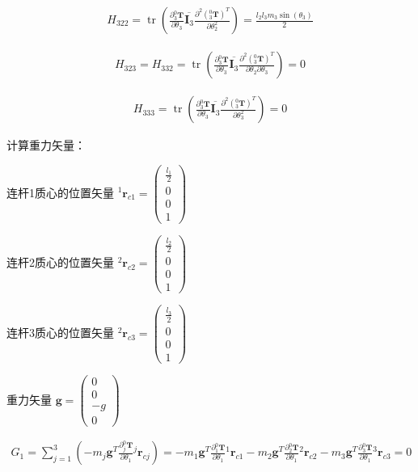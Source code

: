 \documentclass{homework}
\begin{document}
\begin{sol}
\begin{align*}
  H_{322} = \operatorname{tr} (\frac{\partial {^0_3}\mathbf{T}}{\partial \theta_3} \overline{\mathbf{I}_3} \frac{\partial^2 ({^0_3}\mathbf{T})^T}{\partial \theta_2^2})
          = \frac{l_2 l_3 m_3 \sin(\theta_3)}{2}
\end{align*}

\begin{align*}
  H_{323} = H_{332} = \operatorname{tr} (\frac{\partial {^0_3}\mathbf{T}}{\partial \theta_3} \overline{\mathbf{I}_3} \frac{\partial^2 ({^0_3}\mathbf{T})^T}{\partial \theta_2 \partial \theta_3}) 
                    = 0
\end{align*}

\begin{align*}
  H_{333} = \operatorname{tr} (\frac{\partial {^0_3}\mathbf{T}}{\partial \theta_3} \overline{\mathbf{I}_3} \frac{\partial^2 ({^0_3}\mathbf{T})^T}{\partial \theta_3^2}) 
          = 0
\end{align*}

计算重力矢量：

连杆1质心的位置矢量 $ {^1}\mathbf{r}_{c1} = \begin{pmatrix}
    \frac{l_1}{2} \\
    0 \\
    0 \\
    1
  \end{pmatrix} $ 

连杆2质心的位置矢量 $ {^2}\mathbf{r}_{c2} = \begin{pmatrix}
    \frac{l_2}{2} \\
    0 \\
    0 \\
    1
  \end{pmatrix} $ 

连杆3质心的位置矢量 $ {^2}\mathbf{r}_{c3} = \begin{pmatrix}
    \frac{l_3}{2} \\
    0 \\
    0 \\
    1
  \end{pmatrix} $ 

重力矢量 $ \mathbf{g} = \begin{pmatrix}
    0 \\
    0 \\
    -g \\
    0
  \end{pmatrix} $

\begin{align*}
  G_1 = \sum_{j=1}^3 (-m_j \mathbf{g}^T \frac{\partial {^0_j}\mathbf{T}}{\partial \theta_1} {^j}\mathbf{r}_{cj}) 
      = -m_1 \mathbf{g}^T \frac{\partial {^0_1}\mathbf{T}}{\partial \theta_1} {^1}\mathbf{r}_{c1} - m_2 \mathbf{g}^T \frac{\partial {^0_2}\mathbf{T}}{\partial \theta_1} {^2}\mathbf{r}_{c2} - m_3 \mathbf{g}^T \frac{\partial {^0_3}\mathbf{T}}{\partial \theta_1} {^3}\mathbf{r}_{c3}
      = 0
\end{align*}


\end{sol}
\end{document}
